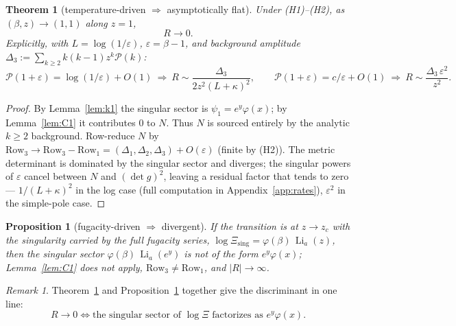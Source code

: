 \documentclass[a4paper,11pt]{article}
\theoremstyle{plain}
\newtheorem{theorem}{Theorem}
\newtheorem{proposition}{Proposition}
\theoremstyle{definition}
\theoremstyle{remark}
\newtheorem{remark}{Remark}
\newcommand{\Ric}{R}                 %
\newcommand{\Li}{\operatorname{Li}}
\newcommand{\eps}{\varepsilon}
\newcommand{\detg}{\det g}
\begin{document}
\begin{theorem}[temperature-driven $\Rightarrow$ asymptotically flat]\label{thm:flat}
Under \textnormal{(H1)--(H2)}, as $(\beta,z)\to(1,1)$ along $z=1$,
\[
   \Ric\longrightarrow 0 .
\]
Explicitly, with $L=\log(1/\eps)$, $\eps=\beta-1$, and background amplitude
$\Delta_3:=\sum_{k\ge2}k(k-1)z^{k}\mathcal P(k)$:
\[
   \mathcal P(1+\eps)=\log(1/\eps)+O(1)\ \Rightarrow\ \Ric\sim\frac{\Delta_3}{2z^{2}(L+\kappa)^{2}},
   \qquad
   \mathcal P(1+\eps)=c/\eps+O(1)\ \Rightarrow\ \Ric\sim \frac{\Delta_3\,\eps^{2}}{z^{2}} .
\]
\end{theorem}
\begin{proof}
By Lemma~\ref{lem:k1} the singular sector is $\psi_1=e^{y}\varphi(x)$; by Lemma~\ref{lem:C1}
it contributes $0$ to $N$. Thus $N$ is sourced entirely by the analytic $k\ge2$ background.
Row-reduce $N$ by $\text{Row}_3\to\text{Row}_3-\text{Row}_1=(\Delta_1,\Delta_2,\Delta_3)+O(\eps)$
(finite by (H2)). The metric determinant is dominated by the singular sector and diverges; the
singular powers of $\eps$ cancel between $N$ and $(\detg)^2$, leaving a residual factor that
tends to zero --- $1/(L+\kappa)^2$ in the log case (full computation in
Appendix~\ref{app:rates}), $\eps^2$ in the simple-pole case. %
\end{proof}

\begin{proposition}[fugacity-driven $\Rightarrow$ divergent]\label{prop:div}
If the transition is at $z\to z_c$ with the singularity carried by the full fugacity series,
$\log\Xi_{\mathrm{sing}}=\varphi(\beta)\,\Li_a(z)$, then the singular sector
$\varphi(\beta)\,\Li_a(e^{y})$ is not of the form $e^{y}\varphi(x)$; Lemma~\ref{lem:C1} does
not apply, $\text{Row}_3\ne\text{Row}_1$, and $|\Ric|\to\infty$.
\end{proposition}

\begin{remark}\label{rem:criterion}
Theorem~\ref{thm:flat} and Proposition~\ref{prop:div} together give the discriminant in one line:
\[
   \boxed{\ \Ric\to0 \iff \text{the singular sector of }\log\Xi\text{ factorizes as } e^{y}\varphi(x).\ }
\]
\end{remark}
\end{document}
